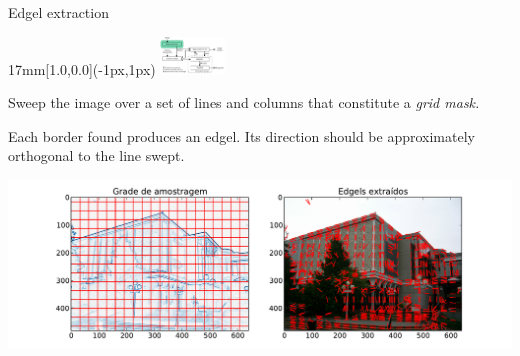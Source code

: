 \begin{frame}{Edgel extraction}
  \begin{textblock*}{17mm}[1.0,0.0](\paperwidth-1px,1px)
    \includegraphics[width=17mm]{blocos_s1.png}
  \end{textblock*}
  Sweep the image over a set of lines and columns that constitute a {\em grid mask.}

  Each border found produces an edgel. Its direction should be approximately orthogonal to the line swept.
  \centerline{\includegraphics[height=8\baselineskip]{griddemo2.pdf}}

\end{frame}















